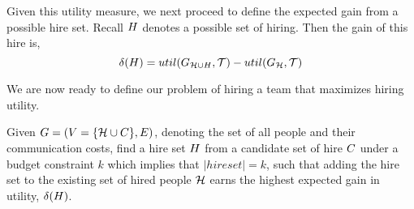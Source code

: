 Given this utility measure, we next proceed to define the expected gain from a possible hire set. Recall ${H}$ denotes a possible set of hiring. Then the gain of this hire is,
$$\delta({H}) = util({G}_{\mathcal{H} \cup {H}},\mathcal{T}) - util({G}_{\mathcal{H}},\mathcal{T}) $$

We are now ready to define our problem of hiring a team that maximizes hiring utility.
\begin{problem}
[HireMax] Given ${G} = ( {V} = \{ \mathcal{H} \cup {C} \}, E)$, denoting the set of all people and their communication costs, find a hire set ${H}$ from a candidate set of hire ${C}$ under a budget constraint $k$ which implies that $|hireset| = k$, such that adding the hire set to the existing set of hired people $\mathcal{H}$ earns the highest expected gain in utility, $\delta({H})$.
\end{problem}